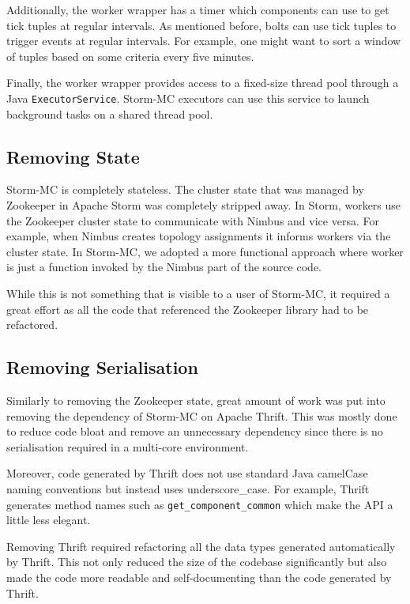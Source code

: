 \documentclass[bsc,twoside,singlespacing,normalheadings,parskip]{infthesis}\usepackage[]{graphicx}\usepackage[]{color}
\let\Oldtodo\todo
\renewcommand{\todo}[1]{\Oldtodo[inline]{#1}}
\begin{document}
Additionally, the worker wrapper has a timer which components can use to get tick tuples at regular intervals. As mentioned before, bolts can use tick tuples to trigger events at regular intervals. For example, one might want to sort a window of tuples based on some criteria every five minutes.

\todo{mention metrics here?}

Finally, the worker wrapper provides access to a fixed-size thread pool through a Java \texttt{ExecutorService}. Storm-MC executors can use this service to launch background tasks on a shared thread pool.

\subsection{Removing State}

Storm-MC is completely stateless. The cluster state that was managed by Zookeeper in Apache Storm was completely stripped away. In Storm, workers use the Zookeeper cluster state to communicate with Nimbus and vice versa. For example, when Nimbus creates topology assignments it informs workers via the cluster state. In Storm-MC, we adopted a more functional approach where worker is just a function invoked by the Nimbus part of the source code.

While this is not something that is visible to a user of Storm-MC, it required a great effort as all the code that referenced the Zookeeper library had to be refactored.

\subsection{Removing Serialisation}

Similarly to removing the Zookeeper state, great amount of work was put into removing the dependency of Storm-MC on Apache Thrift. This was mostly done to reduce code bloat and remove an unnecessary dependency since there is no serialisation required in a multi-core environment.

Moreover, code generated by Thrift does not use standard Java camelCase naming conventions but instead uses underscore\_case. For example, Thrift generates method names such as \texttt{get\_component\_common} which make the API a little less elegant.

Removing Thrift required refactoring all the data types generated automatically by Thrift. This not only reduced the size of the codebase significantly but also made the code more readable and self-documenting than the code generated by Thrift.
\end{document}
